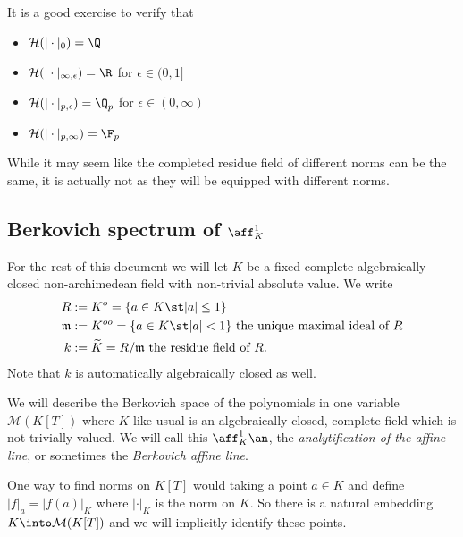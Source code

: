 It is a good exercise to verify that 
\begin{itemize}
	\item  $\mathcal{H}(|\cdot |_0) = \Q$ 
	\item $\mathcal{H} (|\cdot |_{\infty, \epsilon}) = \R$ for $\epsilon \in (0, 1]$
	\item $\mathcal{H} (|\cdot |_{p, \epsilon}) = \Q_p$ for $\epsilon \in (0, \infty)$
	\item $\mathcal{H} (|\cdot |_{p, \infty}) = \F_p$ 
\end{itemize}
While it may seem like the completed residue field of different norms can be the same, it is actually not as they will be equipped with different norms.  


\subsection{Berkovich spectrum of $\aff^{1}_K$} \label{sec:berkovich_specturm_of_affine_line}


For the rest of this document we will let $K$ be a fixed complete algebraically closed non-archimedean field with non-trivial absolute value. We write 
\begin{align*}
	R &:= K^{o} = \{a \in K \st |a| \le 1\} \\
	\mathfrak{m}  &:= K^{oo} =  \{a \in K \st |a| < 1\}  \text{ the unique maximal ideal of } R\\
	k &:= \widetilde K = R / \mathfrak{m} \text{ the residue field of } R
.\end{align*}
Note that $k$ is automatically algebraically closed as well. 

\medskip

We will describe the Berkovich space of the polynomials in one variable  $\mathcal{M} (K[T])$ where $K$ like usual is an algebraically closed, complete field which is not trivially-valued. 
We will call this $\aff_K^{1}\an$, the \emph{analytification of the affine line}, or sometimes the \emph{Berkovich affine line}. 

One way to find norms on $K[T]$ would taking a point $a \in K$ and define $|f|_a = |f(a)|_K$ where $|\cdot |_K$ is the norm on $K$. 
So there is a natural embedding $K \into \mathcal{M}(K[T])$ and we will implicitly identify these points.  

